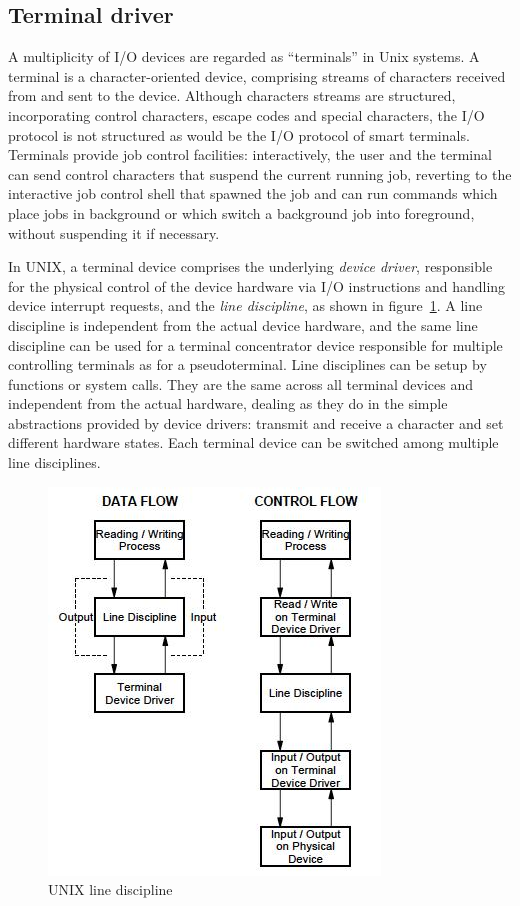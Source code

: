 \subsection{Terminal driver}
A multiplicity of I/O devices are regarded as ``terminals'' in Unix systems. A terminal is a character-oriented device, comprising streams of characters received from and sent to the device. Although characters streams are structured, incorporating control characters, escape codes and special characters, the I/O protocol is not structured as would be the I/O protocol of smart terminals. Terminals provide job control facilities: interactively, the user and the terminal can send control characters that suspend the current running job, reverting to the interactive job control shell that spawned the job and can run commands which place jobs in background or which switch a background job into foreground, without suspending it if necessary.

In UNIX, a terminal device comprises the underlying \emph{device driver}, responsible for the physical control of the device hardware via I/O instructions and handling device interrupt requests, and the \emph{line discipline}, as shown in figure~\ref{unix_line_discipline}. A line discipline is independent from the actual device hardware, and the same line discipline can be used for a terminal concentrator device responsible for multiple controlling terminals as for a pseudoterminal. Line disciplines can be setup by functions or system calls. They are the same across all terminal devices and independent from the actual hardware, dealing as they do in the simple abstractions provided by device drivers: transmit and receive a character and set different hardware states. Each terminal device can be switched among multiple line disciplines.

\begin{figure}[hbtp]
\centering
\includegraphics[scale=0.6]{images/device_management/unix_line_discipline.jpg}
\caption{UNIX line discipline}
\label{unix_line_discipline}
\end{figure}

